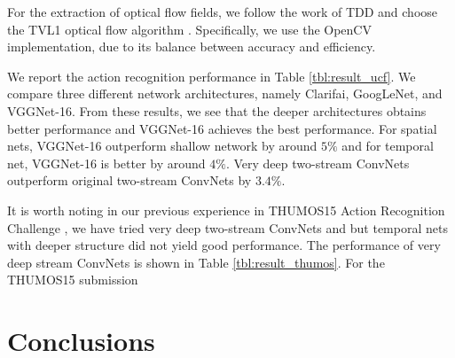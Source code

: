 \documentclass[10pt,twocolumn,letterpaper]{article}
\begin{document}
For the extraction of optical flow fields, we follow the work of TDD \cite{WangQT15a} and choose the TVL1 optical flow algorithm \cite{ZachPB07}. Specifically, we use the OpenCV implementation, due to its balance between accuracy and efficiency.

We report the action recognition performance in Table \ref{tbl:result_ucf}. We compare three different network architectures, namely Clarifai, GoogLeNet, and VGGNet-16. From these results, we see that the deeper architectures obtains better performance and VGGNet-16 achieves the best performance. For spatial nets, VGGNet-16 outperform shallow network by around $5\%$ and for temporal net, VGGNet-16 is better by around $4\%$. Very deep two-stream ConvNets outperform original two-stream ConvNets by $3.4\%$. 

It is worth noting in our previous experience \cite{WangWXQ15} in THUMOS15 Action Recognition Challenge \cite{THUMOS15}, we have tried very deep two-stream ConvNets and but temporal nets with deeper structure did not yield good performance. The performance of very deep stream ConvNets is shown in Table \ref{tbl:result_thumos}. For the THUMOS15 submission

\begin{table}
\begin{center}
\vspace{2mm}
\caption{Performance comparison with the state of the art on UCF101 dataset.}
\end{center}
\end{table}

\section{Conclusions}
\label{sec:conclusion}

{


}
\end{document}
